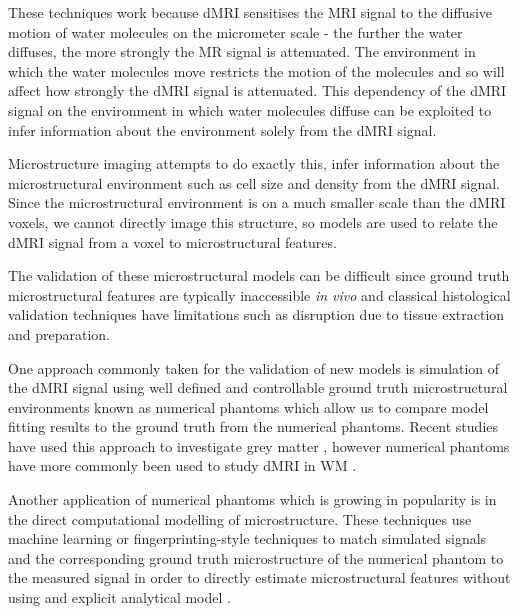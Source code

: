 These techniques work because \ac{dMRI} sensitises the \ac{MRI} signal to the diffusive motion of water molecules on the micrometer scale - the further the water diffuses, the more strongly the MR signal is attenuated.
The environment in which the water molecules move restricts the motion of the molecules and so will affect how strongly the \ac{dMRI} signal is attenuated.
This dependency of the \ac{dMRI} signal on the environment in which water molecules diffuse can be exploited to infer information about the environment solely from the \ac{dMRI} signal.  

Microstructure imaging attempts to do exactly this, infer information about the microstructural environment such as cell size and density from the \ac{dMRI} signal.
Since the microstructural environment is on a much smaller scale than the \ac{dMRI} voxels, we cannot directly image this structure, so models are used to relate the \ac{dMRI} signal from a voxel to microstructural features.

The validation of these microstructural models can be difficult since ground truth microstructural features are typically inaccessible \emph{in vivo} and classical histological validation techniques have limitations such as disruption due to tissue extraction and preparation.

One approach commonly taken for the validation of new models is simulation of the \ac{dMRI} signal using well defined and controllable ground truth microstructural environments known as numerical phantoms which allow us to compare model fitting results to the ground truth from the numerical phantoms. Recent studies have used this approach to investigate grey matter \cite{Palombo2020}, however numerical phantoms have more commonly been used to study \ac{dMRI} in \ac{WM} \cite{Li2019,Jelescu2017,Nilsson2017,Scherrer2016,Tariq2016,Daducci2015,Xu2014,Zhang2012,Nilsson2010}.

Another application of numerical phantoms which is growing in popularity is in the direct computational modelling of microstructure.
These techniques use machine learning or fingerprinting-style techniques to match simulated signals and the corresponding ground truth microstructure of the numerical phantom to the measured signal in order to directly estimate microstructural features without using and explicit analytical model \cite{Rensonnet2018,Hill2019,Palombo2018a,Nedjati-Gilani2017}.

